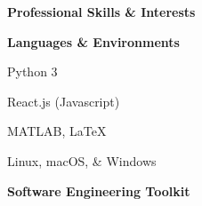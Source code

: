 \documentclass[letterpaper,final]{memoir}
\newcommand{\Sep}{\vspace{1.0em}}
\newcommand{\SmallSep}{\vspace{0.4em}}
\newcommand{\CVSection}[1]
	{\LARGE\textbf{#1}\par
	\SmallSep\normalsize}
\newcommand{\CVItem}[1]
	{\textbf{\color{Blue} #1}}
\begin{document}
\Sep


\notoserif \CVSection{Professional Skills \& Interests}
\normalfont
\SmallSep

\CVItem{Languages \& Environments}
\Sep

\begin{multicols}{1}

    \begin{compactitem}[\color{Blue}$\circ$]

		\item Python 3
        \SmallSep
        \item React.js (Javascript)
        \SmallSep
        \item MATLAB, LaTeX
        \SmallSep
        \item Linux, macOS, \& Windows

	\end{compactitem}

\end{multicols}

\Sep

\CVItem{Software Engineering Toolkit}
\Sep
\end{document}
